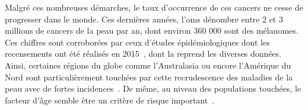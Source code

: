 Malgré ces nombreuses démarches, le taux d’occurrence de ces cancers ne cesse de progresser dans le monde. Ces dernières années, l'\gls{oms} dénombre entre 2 et 3 millions de cancers de la peau par an, dont environ 360 000 sont des mélanomes. Ces chiffres sont corroborées par ceux d'études épidémiologiques dont les recensements ont été réalisés en 2015~\cite{Vos2016}, dont la  reprend les diverses données. Ainsi, certaines régions du globe comme l'Australasia ou encore l'Amérique du Nord sont particulièrement touchées par cette recrudescence des maladies de la peau avec de fortes incidences~\cite{Karimkhani2017}. De même, au niveau des populations touchées, le facteur d'âge semble être un critère de risque important~\cite{Karimkhani2017}.\par 

